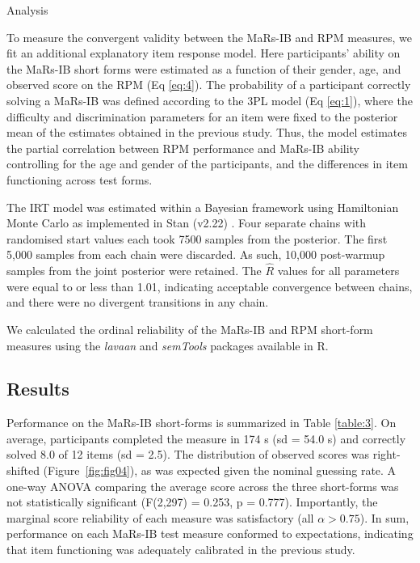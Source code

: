 \documentclass[a4paper,man,natbib]{apa6}
\makeatletter
\renewcommand{\subsubsection}{\@startsection{subsubsection}{3}
  {\z@}%
  {\b@level@two@skip}{\e@level@two@skip}%
  {\normalfont\normalsize\bfseries}}
\makeatother
\begin{document}
\subsubsection{Analysis}

To measure the convergent validity between the MaRs-IB and RPM measures, we fit an additional explanatory item response model. Here participants' ability on the MaRs-IB short forms were estimated as a function of their gender, age, and observed score on the RPM (Eq \ref{eq:4}). The probability of a participant correctly solving a MaRs-IB was defined according to the 3PL model (Eq \ref{eq:1}), where the difficulty and discrimination parameters for an item were fixed to the posterior mean of the estimates obtained in the previous study. Thus, the model estimates the partial correlation between RPM performance and MaRs-IB ability controlling for the age and gender of the participants, and the differences in item functioning across test forms.

The IRT model was estimated within a Bayesian framework using Hamiltonian Monte Carlo as implemented in Stan (v2.22) \citep{carpenter2017stan}. Four separate chains with randomised start values each took 7500 samples from the posterior. The first 5,000 samples from each chain were discarded. As such, 10,000 post-warmup samples from the joint posterior were retained. The $\hat{R}$ values for all parameters were equal to or less than 1.01, indicating acceptable convergence between chains, and there were no divergent transitions in any chain. 

We calculated the ordinal reliability of the MaRs-IB and RPM short-form measures using the \textit{lavaan} \citep{lavaan} and \textit{semTools} \citep{semtools} packages available in R.

\subsection{Results}

Performance on the MaRs-IB short-forms is summarized in Table \ref{table:3}. On average, participants completed the measure in 174 s (sd = 54.0 s) and correctly solved 8.0 of 12 items (sd = 2.5). The distribution of observed scores was right-shifted (Figure~\ref{fig:fig04}), as was expected given the nominal guessing rate. A one-way ANOVA comparing the average score across the three short-forms was not statistically significant (F(2,297) = 0.253, p = 0.777). Importantly, the marginal score reliability of each measure was satisfactory (all $\alpha > 0.75$). In sum, performance on each MaRs-IB test measure conformed to expectations, indicating that item functioning was adequately calibrated in the previous study.
\end{document}
